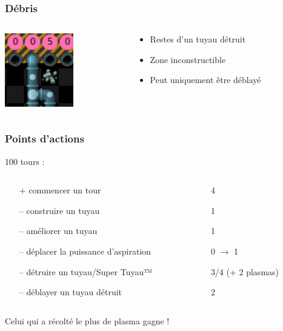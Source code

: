 \documentclass{beamer}
\begin{document}
\begin{frame}
    \frametitle{Débris}
    \begin{columns}[T]
        \begin{column}{.3\textwidth}
            \includegraphics[width=3cm]{pictures/destruction}
        \end{column}
        \begin{column}{.7\textwidth}
            \begin{itemize}
                \item Restes d'un tuyau détruit
                \item Zone inconstructible
                \item Peut uniquement être déblayé
            \end{itemize}
        \end{column}
    \end{columns}
\end{frame}
\begin{frame}
	\frametitle{Points d'actions}
    100 tours :
	\begin{columns}[T]
        \begin{column}{.65\textwidth}
            \begin{itemize}
	            \item[+] commencer un tour
	            \item[\alert{--}] construire un tuyau
	            \item[\alert{--}] améliorer un tuyau
	            \item[\alert{--}] déplacer la puissance d'aspiration
	            \item[\alert{--}] détruire un tuyau/Super Tuyau™
	            \item[\alert{--}] déblayer un tuyau détruit
	        \end{itemize}
        \end{column}
        \begin{column}{.35\textwidth}
            \begin{itemize}
                \item[] 4
	            \item[] 1
	            \item[] 1
	            \item[] 0 $\rightarrow$ 1
                \item[] 3/4 (+ 2 plasmas)
	            \item[] 2
            \end{itemize}
        \end{column}
    \end{columns}
    \vspace{0.5cm}
    Celui qui a récolté le plus de plasma gagne !
\end{frame}
\end{document}
